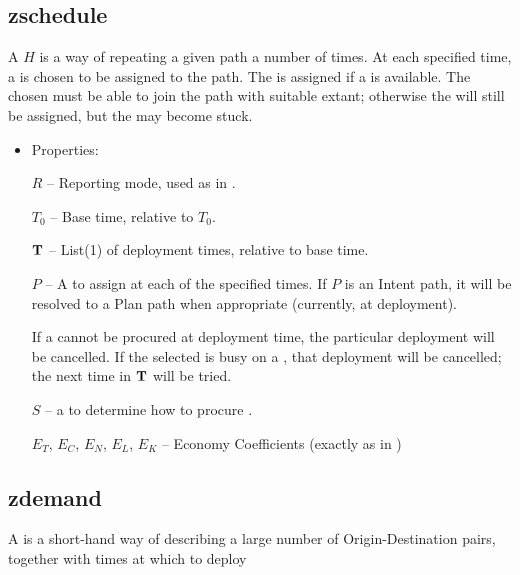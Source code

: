 
\subsection{zschedule}

A  $H$ is a way of repeating a given path a number of times.
At each specified time, a  is chosen to be assigned to the path.
The  is assigned if a  is available.
The chosen  must be able to join the path with
suitable  extant; otherwise the 
will still be assigned, but the  may become stuck. 

\begin{itemize}
\item Properties:

  $R$ -- Reporting mode, used as in .

  $T_{0}$ -- Base time, relative to  $T_0$.

  ${\bf T}$ -- List(1) of deployment times, relative to base time.

  $P$ -- A  to assign at each of the specified times. If $P$ is an Intent path,
  it will be resolved to a Plan path when appropriate (currently, at deployment).

  
  If a  cannot be procured at deployment time, the particular deployment will be cancelled.
  If the  selected is busy on a , that deployment will be cancelled;
  the next time in ${\bf T}$ will be tried. 

  $S$ -- a  to determine how to procure .

  $E_T$, $E_C$, $E_N$, $E_L$, $E_K$ -- Economy Coefficients (exactly as in )

\end{itemize}

\subsection{zdemand}

A  is a short-hand way of describing a large number of Origin-Destination pairs,
together with times at which to deploy 

